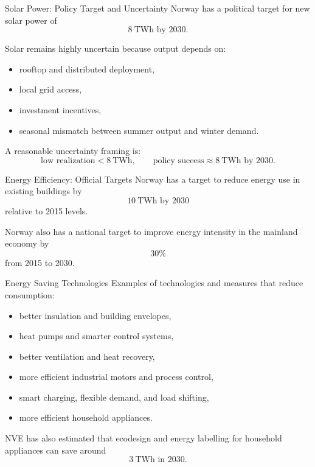 \documentclass[aspectratio=169]{beamer}
\begin{document}
\begin{frame}{Solar Power: Policy Target and Uncertainty}
Norway has a political target for new solar power of
\[
8\ \text{TWh by 2030}.
\]

\medskip

Solar remains highly uncertain because output depends on:
\begin{itemize}
    \item rooftop and distributed deployment,
    \item local grid access,
    \item investment incentives,
    \item seasonal mismatch between summer output and winter demand.
\end{itemize}

\medskip

A reasonable uncertainty framing is:
\[
\text{low realization} < 8\ \text{TWh}, \qquad
\text{policy success} \approx 8\ \text{TWh by 2030}.
\]
\end{frame}

\begin{frame}{Energy Efficiency: Official Targets}
Norway has a target to reduce energy use in existing buildings by
\[
10\ \text{TWh by 2030}
\]
relative to 2015 levels.

\medskip

Norway also has a national target to improve energy intensity in the mainland economy by
\[
30\%
\]
from 2015 to 2030.
\end{frame}

\begin{frame}{Energy Saving Technologies}
Examples of technologies and measures that reduce consumption:
\begin{itemize}
    \item better insulation and building envelopes,
    \item heat pumps and smarter control systems,
    \item better ventilation and heat recovery,
    \item more efficient industrial motors and process control,
    \item smart charging, flexible demand, and load shifting,
    \item more efficient household appliances.
\end{itemize}

\medskip

NVE has also estimated that ecodesign and energy labelling for household appliances can save around
\[
3\ \text{TWh in 2030}.
\]
\end{frame}
\end{document}
